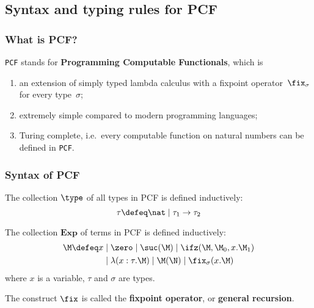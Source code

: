 \subsection{Syntax and typing rules for PCF}
\begin{frame}
  \frametitle{What is PCF?}
  \texttt{PCF} stands for \textbf{Programming Computable Functionals}, which is
  \begin{enumerate}
    \item an extension of simply typed lambda calculus with a fixpoint
      operator~$\fix_\sigma$ for every type~$\sigma$; 
    \item extremely simple compared to modern programming languages;
    \item Turing complete, i.e.\ every computable function on natural numbers
      can be defined in \texttt{PCF}.
  \end{enumerate}
\end{frame}
\begin{frame}
  \frametitle{Syntax of PCF}
  \begin{definition}
    The collection $\type$ of all types in PCF is defined inductively:
    \[
      \tau \defeq \nat \mid \tau_1 \to \tau_2
    \]
  \end{definition}
  \begin{definition}
    The collection $\mathbf{Exp}$ of terms in PCF is defined inductively:
    \begin{align*}
      \M \defeq x & \mid \zero \mid \suc(\M) \mid \ifz(\M, \M_0, x . \M_1) \\
      & \mid \lambda (x : \tau . \M) \mid \M (\N) \mid \fix_\sigma(x . \M)
    \end{align*}
    where $x$ is a variable, $\tau$ and $\sigma$ are types. 
  \end{definition}
  The construct $\fix$ is called the \textbf{fixpoint operator}, or
  \textbf{general recursion}.
\end{frame}
